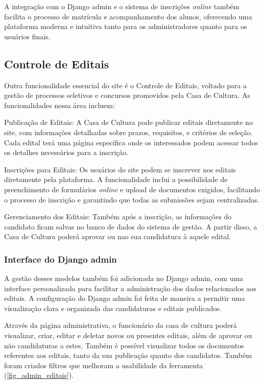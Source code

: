 A integração com o Django admin e o sistema de inscrições \textit{online} também facilita o processo de matrícula e acompanhamento dos alunos, oferecendo uma plataforma moderna e intuitiva tanto para os administradores quanto para os usuários finais.

\subsection{Controle de Editais}

Outra funcionalidade essencial do site é o Controle de Editais, voltado para a gestão de processos seletivos e concursos promovidos pela Casa de Cultura. As funcionalidades nessa área incluem:

Publicação de Editais: A Casa de Cultura pode publicar editais diretamente no site, com informações detalhadas sobre prazos, requisitos, e critérios de seleção. Cada edital terá uma página específica onde os interessados podem acessar todos os detalhes necessários para a inscrição.

Inscrições para Editais: Os usuários do site podem se inscrever nos editais diretamente pela plataforma. A funcionalidade inclui a possibilidade de preenchimento de formulários \textit{online} e upload de documentos exigidos, facilitando o processo de inscrição e garantindo que todas as submissões sejam centralizadas.

Gerenciamento dos Editais: Também após a inscrição, as informações do candidato ficam salvas no banco de dados do sistema de gestão. A partir disso, a Casa de Cultura poderá aprovar ou nao sua candidatura à aquele edital.

\subsubsection{Interface do Django admin}

A gestão desses modelos também foi adicionada no Django admin, com uma interface personalizada para facilitar a administração dos dados relacionados aos editais. A configuração do Django admin foi feita de maneira a permitir uma visualização clara e organizada das candidaturas e editais publicados.

Através da página administrativa, o funcionário da casa de cultura poderá visualizar, criar, editar e deletar novos ou presentes editais, além de aprovar ou não candidaturas a estes. Também é possível visualizar todos os documentos referentes aos editais, tanto da sua publicação quanto dos candidatos. Também foram criados filtros que melhoram a usabilidade da ferramenta (\autoref{fig_admin_editais}).

